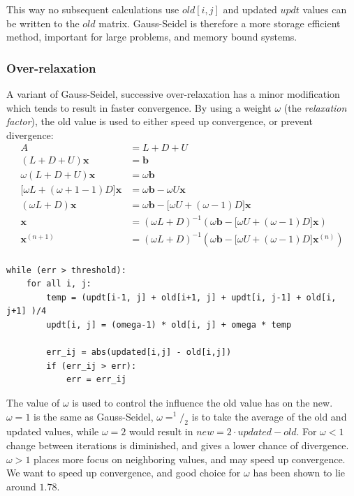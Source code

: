 This way no subsequent calculations use $old[i, j]$ and updated $updt$ values can be written to the $old$ matrix. Gauss-Seidel
is therefore a more storage efficient method, important for large problems, and memory bound systems.

\subsubsection*{Over-relaxation}
A variant of Gauss-Seidel, successive over-relaxation has a minor modification which tends to result in faster convergence.
By using a weight $\omega$ (the \emph{relaxation factor}), the old value is used to either speed up convergence, or prevent divergence:
\begin{align*}
	A &= L + D + U\\
	(L + D + U)\mathbf{x} &= \mathbf{b}\\
	\omega(L + D + U)\mathbf{x} &= \omega\mathbf{b}\\
	\big[\omega L+ (\omega + 1 - 1)D\big]\mathbf{x} &= \omega\mathbf{b}-\omega U\mathbf{x}\\
	(\omega L + D)\mathbf{x} &= \omega\mathbf{b}-\big[\omega U + (\omega-1)D\big]\mathbf{x}\\
	\mathbf{x} &= (\omega L+D)^{-1}(\omega\mathbf{b}-\big[\omega U + (\omega-1)D\big]\mathbf{x})\\
	\mathbf{x}^{(n+1)} &= (\omega L+D)^{-1}(\omega\mathbf{b}-\big[\omega U + (\omega-1)D\big]\mathbf{x}^{(n)})\\
\end{align*}
\begin{lstlisting}
while (err > threshold):
	for all i, j:
		temp = (updt[i-1, j] + old[i+1, j] + updt[i, j-1] + old[i, j+1] )/4
		updt[i, j] = (omega-1) * old[i, j] + omega * temp
		
		err_ij = abs(updated[i,j] - old[i,j])
		if (err_ij > err):
			err = err_ij
\end{lstlisting}

The value of $\omega$ is used to control the influence the old value has on the new. $\omega = 1$ is the same as
Gauss-Seidel, $\omega = ^1\!/_2$ is to take the average of the old and updated values, while $\omega = 2$ would result in $ new = 2\cdot updated - old$.
For $\omega < 1$ change between iterations is diminished, and gives a lower chance of divergence. $\omega > 1$ places
more focus on neighboring values, and may speed up convergence. We want to speed up convergence, and good choice for
$\omega$ has been shown to lie around $1.78$. 

